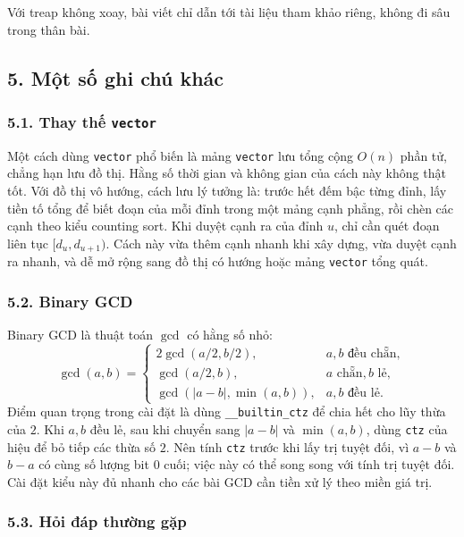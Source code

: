 \documentclass[11pt]{article}
\begin{document}
Với treap không xoay, bài viết chỉ dẫn tới tài liệu tham khảo riêng, không đi
sâu trong thân bài.

\subsection*{5. Một số ghi chú khác}

\subsubsection*{5.1. Thay thế \texttt{vector}}

Một cách dùng \texttt{vector} phổ biến là mảng \texttt{vector} lưu tổng cộng
\(O(n)\) phần tử, chẳng hạn lưu đồ thị. Hằng số thời gian và không gian của
cách này không thật tốt. Với đồ thị vô hướng, cách lưu lý tưởng là: trước hết
đếm bậc từng đỉnh, lấy tiền tố tổng để biết đoạn của mỗi đỉnh trong một mảng
cạnh phẳng, rồi chèn các cạnh theo kiểu counting sort. Khi duyệt cạnh ra của
đỉnh \(u\), chỉ cần quét đoạn liên tục \([d_u,d_{u+1})\). Cách này vừa thêm
cạnh nhanh khi xây dựng, vừa duyệt cạnh ra nhanh, và dễ mở rộng sang đồ thị có
hướng hoặc mảng \texttt{vector} tổng quát.

\subsubsection*{5.2. Binary GCD}

Binary GCD là thuật toán \(\gcd\) có hằng số nhỏ:
\[
\gcd(a,b)=
\begin{cases}
2\gcd(a/2,b/2), & a,b\text{ đều chẵn},\\
\gcd(a/2,b), & a\text{ chẵn}, b\text{ lẻ},\\
\gcd(|a-b|,\min(a,b)), & a,b\text{ đều lẻ}.
\end{cases}
\]
Điểm quan trọng trong cài đặt là dùng \texttt{\_\_builtin\_ctz} để chia hết cho
lũy thừa của \(2\). Khi \(a,b\) đều lẻ, sau khi chuyển sang \(|a-b|\) và
\(\min(a,b)\), dùng \texttt{ctz} của hiệu để bỏ tiếp các thừa số \(2\). Nên
tính \texttt{ctz} trước khi lấy trị tuyệt đối, vì \(a-b\) và \(b-a\) có cùng số
lượng bit \(0\) cuối; việc này có thể song song với tính trị tuyệt đối. Cài đặt
kiểu này đủ nhanh cho các bài GCD cần tiền xử lý theo miền giá trị.

\subsubsection*{5.3. Hỏi đáp thường gặp}
\end{document}
